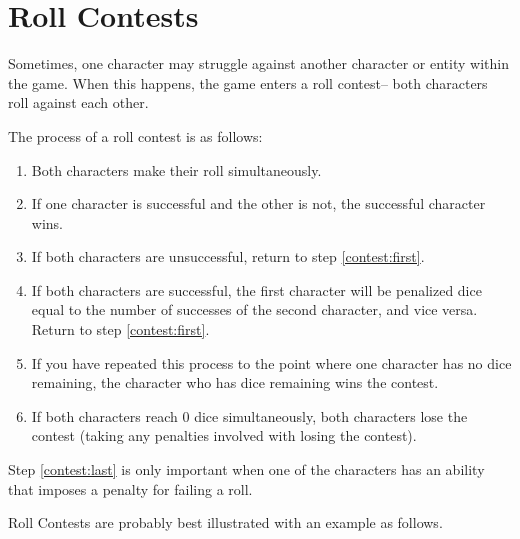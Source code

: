 \section{Roll Contests}

Sometimes, one character may struggle against another character or entity within the game. When this happens, the game enters a roll contest-- both characters roll against each other.

The process of a roll contest is as follows:
\begin{enumerate}
	\item\label{contest:first} Both characters make their roll simultaneously.
	\item If one character is successful and the other is not, the successful character wins.
	\item If both characters are unsuccessful, return to step \ref{contest:first}.
	\item If both characters are successful, the first character will be penalized dice equal to the number of successes of the second character, and vice versa. Return to step \ref{contest:first}.
	\item If you have repeated this process to the point where one character has no dice remaining, the character who has dice remaining wins the contest.
	\item\label{contest:last} If both characters reach 0 dice simultaneously, both characters lose the contest (taking any penalties involved with losing the contest).
\end{enumerate}

Step \ref{contest:last} is only important when one of the characters has an ability that imposes a penalty for failing a roll.

Roll Contests are probably best illustrated with an example as follows.

